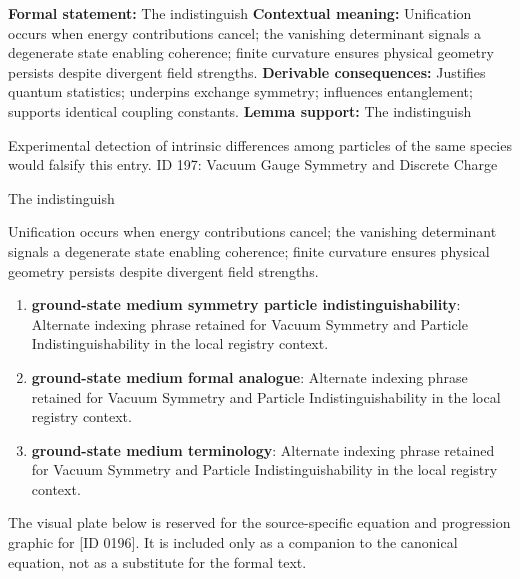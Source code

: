 \begingroup\footnotesize\setlength{\emergencystretch}{3em}\sloppy
\textbf{Formal statement:} The indistinguish
\textbf{Contextual meaning:} Unification occurs when energy contributions cancel; the vanishing determinant signals a degenerate state enabling coherence; finite curvature ensures physical geometry persists despite divergent field strengths.
\textbf{Derivable consequences:} Justifies quantum statistics; underpins exchange symmetry; influences entanglement; supports identical coupling constants.  
\textbf{Lemma support:} The indistinguish\par
\endgroup

Experimental detection of intrinsic differences among particles of the same species would falsify this entry. ID 197: Vacuum Gauge Symmetry and Discrete Charge  

The indistinguish

Unification occurs when energy contributions cancel; the vanishing determinant signals a degenerate state enabling coherence; finite curvature ensures physical geometry persists despite divergent field strengths.
\endgroup

\begin{enumerate}[leftmargin=1.6em,itemsep=6pt,topsep=4pt]
\item \textbf{ground-state medium symmetry particle indistinguishability}: Alternate indexing phrase retained for Vacuum Symmetry and Particle Indistinguishability in the local registry context.
\item \textbf{ground-state medium formal analogue}: Alternate indexing phrase retained for Vacuum Symmetry and Particle Indistinguishability in the local registry context.
\item \textbf{ground-state medium terminology}: Alternate indexing phrase retained for Vacuum Symmetry and Particle Indistinguishability in the local registry context.
\end{enumerate}

\begingroup\footnotesize\sloppy
The visual plate below is reserved for the source-specific equation and progression graphic for [ID 0196]. It is included only as a companion to the canonical equation, not as a substitute for the formal text.
\par\endgroup
\ifTZPDarkEdition
{}
\fi

